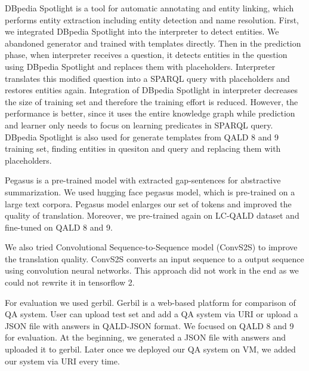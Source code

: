 DBpedia Spotlight \cite{isem2013daiber} is a tool for automatic annotating and entity linking, 
which performs entity extraction including entity detection and name resolution. 
First, we integrated DBpedia Spotlight into the interpreter to detect entities. 
We abandoned generator and trained with templates directly. 
Then in the prediction phase, 
when interpreter receives a question, 
it detects entities in the question using DBpedia Spotlight and replaces them with placeholders.
Interpreter translates this modified question into a SPARQL query with placeholders
and restores entities again. 
Integration of DBpedia Spotlight in interpreter decreases the size of training set
and therefore the training effort is reduced. 
However, the performance is better,
since it uses the entire knowledge graph while prediction
and learner only needs to focus on learning predicates in SPARQL query. 
DBpedia Spotlight is also used for generate templates from QALD 8 and 9 training set,
finding entities in quesiton and query and replacing them with placeholders. 

Pegasus\cite{10.5555/3524938.3525989} is a pre-trained model with extracted gap-sentences for abstractive summarization. 
We used hugging face pegasus model, which is pre-trained on a large text corpora. 
Pegasus model enlarges our set of tokens and improved the quality of translation. 
Moreover, we pre-trained again on LC-QALD dataset and fine-tuned on QALD 8 and 9. 


We also tried Convolutional Sequence-to-Sequence model (ConvS2S) \cite{DBLP:journals/corr/GehringAGYD17} to improve the translation quality.
ConvS2S converts an input sequence to a output sequence using convolution neural networks. 
This approach did not work in the end
as we could not rewrite it in tensorflow 2. 

For evaluation we used gerbil\cite{gerbil}.
Gerbil is a web-based platform for comparison of QA system. 
User can upload test set and add a QA system via URI or upload a JSON file with answers in QALD-JSON format. 
We focused on QALD 8 and 9 for evaluation. 
At the beginning, we generated a JSON file with answers and uploaded it to gerbil. 
Later once we deployed our QA system on VM, we added our system via URI every time. 

